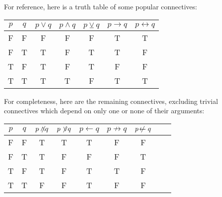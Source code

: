 \documentclass[12pt]{article}
\begin{document}
For reference, here is a truth table of some popular connectives:

\begin{center}
\begin{tabular}{ccccccc}
$p$ & $q$ & $p \lor q$ & $p \land q$ & $p \veebar q$ & $p \rightarrow q$ & $p \leftrightarrow q$ \\
\hline 
F & F & F & F & F & T & T \\
F & T & T & F & T & T & F \\
T & F & T & F & T & F & F \\
T & T & T & T & F & T & T
\end{tabular}
\end{center}

For completeness, here are the remaining connectives, excluding trivial connectives which
depend on only one or none of their arguments:

\begin{center}
\begin{tabular}{ccccccccc}
$p$ & $q$ & $p \not\!\!\land q$ & $p \not\!\lor q$ & $p \leftarrow q$ & $p \not\rightarrow q$ & $p \not\!\leftarrow q$ \\
\hline 
F & F & T & T & T & F & F \\
F & T & T & F & F & F & T \\
T & F & T & F & T & T & F \\
T & T & F & F & T & F & F
\end{tabular}
\end{center}
\end{document}
